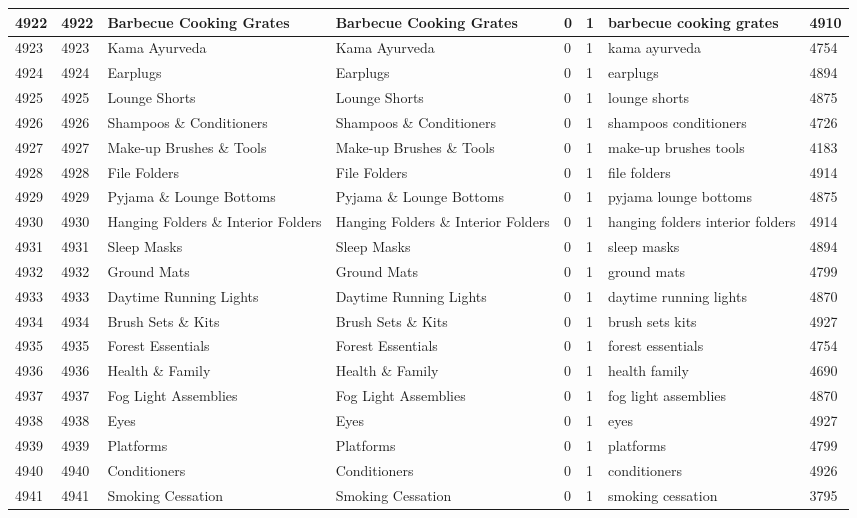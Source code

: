 \begin{longtable}{|l|l|l|l|l|l|l|l|}
4922 & 4922 & Barbecue Cooking Grates & Barbecue Cooking Grates & 0 & 1 & barbecue cooking grates & 4910 \\ \hline 
4923 & 4923 & Kama Ayurveda & Kama Ayurveda & 0 & 1 & kama ayurveda & 4754 \\ \hline 
4924 & 4924 & Earplugs & Earplugs & 0 & 1 & earplugs & 4894 \\ \hline 
4925 & 4925 & Lounge Shorts & Lounge Shorts & 0 & 1 & lounge shorts & 4875 \\ \hline 
4926 & 4926 & Shampoos \& Conditioners & Shampoos \& Conditioners & 0 & 1 & shampoos conditioners & 4726 \\ \hline 
4927 & 4927 & Make-up Brushes \& Tools & Make-up Brushes \& Tools & 0 & 1 & make-up brushes tools & 4183 \\ \hline 
4928 & 4928 & File Folders & File Folders & 0 & 1 & file folders & 4914 \\ \hline 
4929 & 4929 & Pyjama \& Lounge Bottoms & Pyjama \& Lounge Bottoms & 0 & 1 & pyjama lounge bottoms & 4875 \\ \hline 
4930 & 4930 & Hanging Folders \& Interior Folders & Hanging Folders \& Interior Folders & 0 & 1 & hanging folders interior folders & 4914 \\ \hline 
4931 & 4931 & Sleep Masks & Sleep Masks & 0 & 1 & sleep masks & 4894 \\ \hline 
4932 & 4932 & Ground Mats & Ground Mats & 0 & 1 & ground mats & 4799 \\ \hline 
4933 & 4933 & Daytime Running Lights & Daytime Running Lights & 0 & 1 & daytime running lights & 4870 \\ \hline 
4934 & 4934 & Brush Sets \& Kits & Brush Sets \& Kits & 0 & 1 & brush sets kits & 4927 \\ \hline 
4935 & 4935 & Forest Essentials & Forest Essentials & 0 & 1 & forest essentials & 4754 \\ \hline 
4936 & 4936 & Health \& Family & Health \& Family & 0 & 1 & health family & 4690 \\ \hline 
4937 & 4937 & Fog Light Assemblies & Fog Light Assemblies & 0 & 1 & fog light assemblies & 4870 \\ \hline 
4938 & 4938 & Eyes & Eyes & 0 & 1 & eyes & 4927 \\ \hline 
4939 & 4939 & Platforms & Platforms & 0 & 1 & platforms & 4799 \\ \hline 
4940 & 4940 & Conditioners & Conditioners & 0 & 1 & conditioners & 4926 \\ \hline 
4941 & 4941 & Smoking Cessation & Smoking Cessation & 0 & 1 & smoking cessation & 3795 \\ \hline 

\end{longtable}
